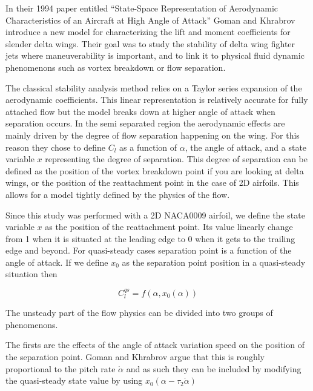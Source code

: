 
In their 1994 paper entitled ``State-Space Representation of Aerodynamic Characteristics of an Aircraft at High Angle of Attack'' \cite{GK} Goman and Khrabrov introduce a new model for characterizing the lift and moment coefficients for slender delta wings.
Their goal was to study the stability of delta wing fighter jets where maneuverability is important, and to link it to physical fluid dynamic phenomenons such as vortex breakdown or flow separation.

\par The classical stability analysis method relies on a Taylor series expansion of the aerodynamic coefficients.
This linear representation is relatively accurate for fully attached flow but the model breaks down at higher angle of attack when separation occurs.
In the semi separated region the aerodynamic effects are mainly driven by the degree of flow separation happening on the wing.
For this reason they chose to define $C_l$ as a function of $\alpha$, the angle of attack, and a state variable $x$ representing the degree of separation.
This degree of separation can be defined as the position of the vortex breakdown point if you are looking at delta wings, or the position of the reattachment point in the case of 2D airfoils.
This allows for a model tightly defined by the physics of the flow.


Since this study was performed with a 2D NACA0009 airfoil, we define the state variable $x$ as the position of the reattachment point.
Its value linearly change from 1 when it is situated at the leading edge to 0 when it gets to the trailing edge and beyond.
For quasi-steady cases separation point is a function of the angle of attack. If we define $x_0$ as the separation point position in a quasi-steady situation then

\begin{equation}
  C_l^{qs} = f(\alpha,x_0(\alpha))
  \label{eqn:qs_Cl}
\end{equation}

The unsteady part of the flow physics can be divided into two groups of phenomenons.

\par The firsts are the effects of the angle of attack variation speed on the position of the separation point.
Goman and Khrabrov argue that this is roughly proportional to the pitch rate $\dot{\alpha}$ and as such they can be included by modifying the quasi-steady state value by using $x_0 (\alpha - \tau_2 \dot{\alpha})$ 

